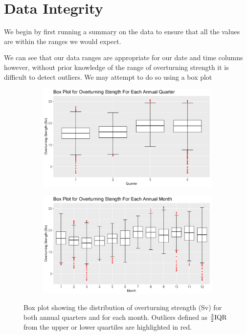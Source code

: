 \section{Data Integrity}

We begin by first running a summary on the data to ensure that all the values are within the ranges we would expect.



We can see that our data ranges are appropriate for our date and time columns however, without prior knowledge of the range of overturning strength it is difficult to detect outliers. We may attempt to do so using a box plot

\begin{figure}[H]
    \centering
    \begin{subfigure}[b]{\sOneSize\textwidth}
        \centering
        \includegraphics[width=\textwidth]{Sections/DataIntegretity/Plots/Box(yr).png}
    \end{subfigure}
    \begin{subfigure}[b]{\sOneSize\textwidth}
        \centering
        \includegraphics[width=\textwidth]{Sections/DataIntegretity/Plots/Box(mnth).png}
    \end{subfigure}
\caption{Box plot showing the distribution of overturning strength (Sv) for both annual quarters and for each month. Outliers defined as $\frac{3}{2}\text{I}\text{Q}\text{R}$ from the upper or lower quartiles are highlighted in red.}\label{S1fig:boxplot(yr)}
\end{figure}

